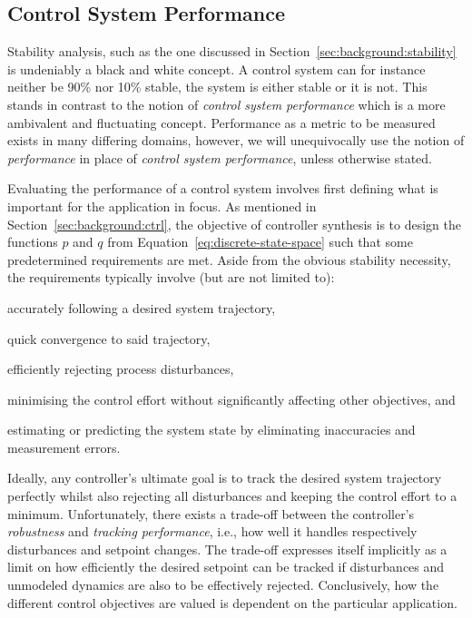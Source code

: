 \subsection{Control System Performance}%
\label{sec:background:performance}%
%
Stability analysis, such as the one discussed in Section~\ref{sec:background:stability} is undeniably a black and white concept.
A control system can for instance neither be 90\% nor 10\% stable, the system is either stable or it is not.
This stands in contrast to the notion of \emph{control system performance} which is a more ambivalent and fluctuating concept.
Performance as a metric to be measured exists in many differing domains, however, we will unequivocally use the notion of \emph{performance} in place of \emph{control system performance}, unless otherwise stated.

Evaluating the performance of a control system involves first defining what is important for the application in focus.
As mentioned in Section~\ref{sec:background:ctrl}, the objective of controller synthesis is to design the functions $p$ and $q$ from Equation~\eqref{eq:discrete-state-space} such that some predetermined requirements are met.
Aside from the obvious stability necessity, the requirements typically involve (but are not limited to):
%
\begin{enumerate*}[label=(\roman*)]
    \item accurately following a desired system trajectory,
    \item quick convergence to said trajectory,
    \item efficiently rejecting process disturbances,
    \item minimising the control effort without significantly affecting other objectives, and
    \item estimating or predicting the system state by eliminating inaccuracies and measurement errors.
\end{enumerate*}
%
Ideally, any controller's ultimate goal is to track the desired system trajectory perfectly whilst also rejecting all disturbances and keeping the control effort to a minimum.
Unfortunately, there exists a trade-off between the controller's \emph{robustness} and \emph{tracking performance}, i.e., how well it handles respectively disturbances and setpoint changes.
The trade-off expresses itself implicitly as a limit on how efficiently the desired setpoint can be tracked if disturbances and unmodeled dynamics are also to be effectively rejected.
Conclusively, how the different control objectives are valued is dependent on the particular application.

